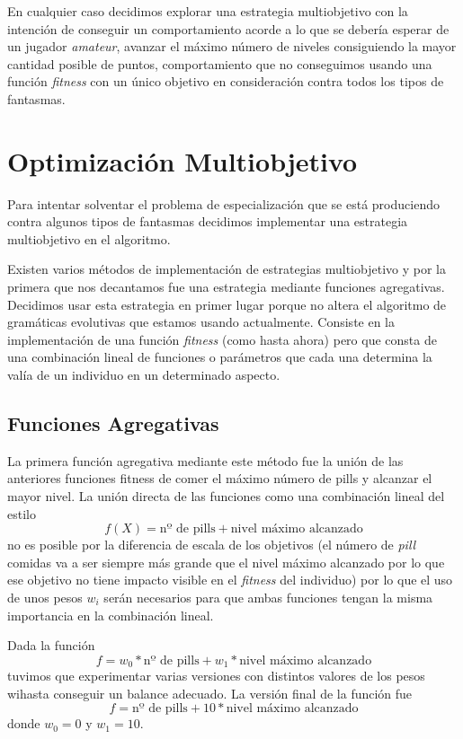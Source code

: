 En cualquier caso decidimos explorar una estrategia multiobjetivo con la intención de conseguir un comportamiento acorde a lo que se debería esperar de un jugador \textit{amateur}, avanzar el máximo número de niveles consiguiendo la mayor cantidad posible de puntos, comportamiento que no conseguimos usando una función \textit{fitness} con un único objetivo en consideración contra todos los tipos de fantasmas.

\section{Optimización Multiobjetivo}
Para intentar solventar el problema de especialización que se está produciendo contra algunos tipos de fantasmas decidimos implementar una estrategia multiobjetivo en el algoritmo.

Existen varios métodos de implementación de estrategias multiobjetivo y por la primera que nos decantamos fue una estrategia mediante funciones agregativas. Decidimos usar esta estrategia en primer lugar porque no altera el algoritmo de gramáticas evolutivas que estamos usando actualmente. Consiste en la implementación de una función \textit{fitness} (como hasta ahora) pero que consta de una combinación lineal de funciones o parámetros que cada una determina la valía de un individuo en un determinado aspecto.

\subsection{Funciones Agregativas}
La primera función agregativa mediante este método fue la unión de las anteriores funciones fitness de comer el máximo número de pills y alcanzar el mayor nivel. La unión directa de las funciones como una combinación lineal del estilo
\begin{equation}
f(X) = \textrm{nº de pills} + \textrm{nivel máximo alcanzado}
\end{equation}
no es posible por la diferencia de escala de los objetivos (el número de \textit{pill} comidas va a ser siempre más grande que el nivel máximo alcanzado por lo que ese objetivo no tiene impacto visible en el \textit{fitness} del individuo) por lo que el uso de unos pesos $w_i$ serán necesarios para que ambas funciones tengan la misma importancia en la combinación lineal.

Dada la función
\begin{equation}
f = w_0 * \textrm{nº de pills} + w_1 * \textrm{nivel máximo alcanzado}
\end{equation}
tuvimos que experimentar varias versiones con distintos valores de los pesos wihasta conseguir un balance adecuado. La versión final de la función fue
\begin{equation}
f = \textrm{nº de pills} + 10 * \textrm{nivel máximo alcanzado}
\end{equation}
donde $w_0 = 0$ y $w_1 = 10$.

